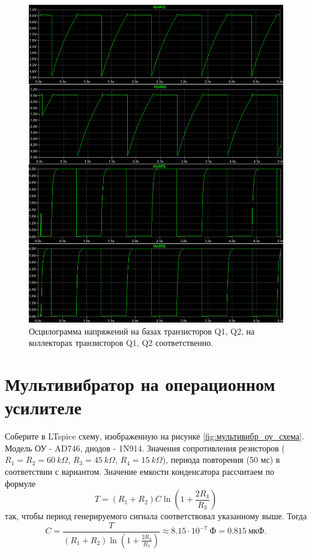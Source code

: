 \begin{figure}[H]
    \centering
    \includegraphics[width=\linewidth]{figs/Q12.png}
    \caption{Осцилограмма напряжений на базах транзисторов Q1, Q2, на
    коллекторах транзисторов Q1, Q2 соответственно.}
    \label{fig:Q12}
\end{figure}


\section*{Мультивибратор на операционном усилителе}

Соберите в LTspice схему, изображенную на рисунке \ref{fig:мультивибр_оу_схема}. Модель ОУ - AD746, диодов - 1N914.
Значения сопротивления резисторов ($R_1=R_2=60\ k\Omega$, $R_3=45\ k\Omega$, $R_4=15\ k\Omega$), 
периода повторения (50 мс) в соответствии с вариантом.
Значение емкости конденсатора рассчитаем по формуле
\begin{equation*}
    T=(R_1+R_2)C\ln(1+\frac{2R_4}{R_3})
\end{equation*}
так, чтобы период генерируемого сигнала соответствовал указанному выше.
Тогда
\begin{equation*}
    C=\frac{T}{(R_1+R_2)\ln(1+\frac{2R_4}{R_3})}\approx 8.15\cdot10^{-7}\ \text{Ф} = 0.815\ \text{мкФ}.
\end{equation*}

